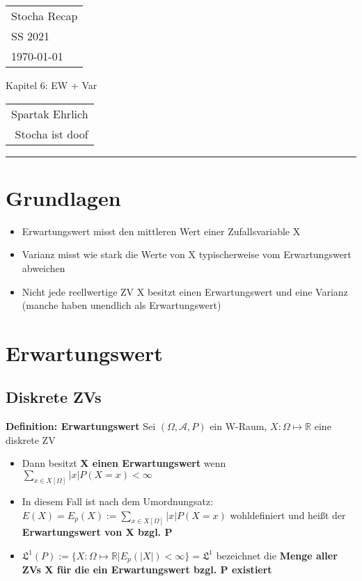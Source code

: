 \documentclass[a4paper,11pt]{scrartcl}
\begin{document}
{\raggedright
\begin{tabular}{l}
    Stocha Recap \\
    SS 2021 \\
    \today{}
\end{tabular}}
\hfill
{\Large Kapitel 6: EW + Var}
\hfill
\begin{tabular}{r}
    Spartak Ehrlich \\
    Stocha ist doof
\end{tabular}
\hrule

\section{Grundlagen}
\begin{itemize}
    \item Erwartungswert misst den mittleren Wert einer Zufallsvariable X
    \item Varianz misst wie stark die Werte von X typischerweise vom Erwartungswert abweichen
    \item Nicht jede reellwertige ZV X besitzt einen Erwartungswert und eine Varianz (manche haben unendlich als Erwartungswert)
\end{itemize}

\section{Erwartungswert}
\subsection{Diskrete ZVs}
\textbf{Definition: Erwartungswert}
Sei $(\Omega,\mathcal{A},P)$ ein W-Raum, $X :\Omega \mapsto \mathbb{R}$ eine diskrete ZV

\begin{itemize}
    \item Dann besitzt \textbf{X einen Erwartungswert} wenn $ \sum_{x \in X[\Omega]} |x| P(X=x) < \infty$
    \item In diesem Fall ist nach dem Umordnungsatz: $E(X) = E_p(X) := \sum_{x \in X[\Omega]} |x| P(X=x)$ wohldefiniert und heißt der \textbf{Erwartungswert von X bzgl. P}
    \item $\mathfrak{L}^1 (P) := \{X:\Omega \mapsto \mathbb{R} | E_p (|X|) <\infty\} = \mathfrak{L}^1$ bezeichnet die \textbf{Menge aller ZVs X für die ein Erwartungswert bzgl. P existiert}
\end{itemize}
\end{document}
